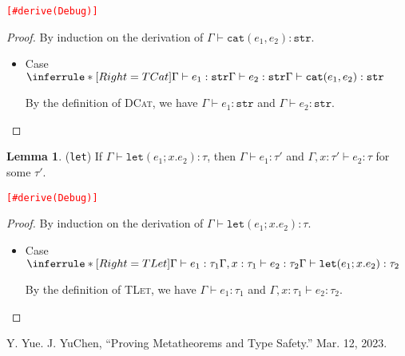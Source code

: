 \documentclass{article}
\theoremstyle{definition}
\newtheorem{lemma}{Lemma}[section]
\begin{document}
\noindent\textcolor{red}{\texttt{[\#derive(Debug)]}}
\color{red}
\begin{proof}
    By induction on the derivation of $\Gamma\vdash \mathtt{cat}(e_1,e_2):\mathtt{str}$.
    \begin{itemize}
        \item Case $\inferrule*[Right=TCat]{\Gamma \vdash e_1:\mathtt{str} \\ \Gamma \vdash e_2:\mathtt{str}}{\Gamma \vdash \mathtt{cat}(e_1,e_2) : \mathtt{str}}$

              By the definition of \textsc{DCat}, we have $\Gamma\vdash e_1:\mathtt{str}$ and $\Gamma\vdash e_2:\mathtt{str}$.
    \end{itemize}
\end{proof}
\color{black}

\begin{lemma}
    (\texttt{let}) If $\Gamma\vdash \mathtt{let}(e_1;x.e_2):\tau$, then $\Gamma\vdash e_1:\tau'$ and $\Gamma,x:\tau'\vdash e_2:\tau$ for some $\tau'$.
\end{lemma}

\noindent\textcolor{red}{\texttt{[\#derive(Debug)]}}
\color{red}
\begin{proof}
    By induction on the derivation of $\Gamma\vdash \mathtt{let}(e_1;x.e_2):\tau$.
    \begin{itemize}
        \item Case $\inferrule*[Right=TLet]{\Gamma \vdash e_1:\tau_1 \\ \Gamma,x:\tau_1 \vdash e_2:\tau_2}{\Gamma \vdash \mathtt{let}(e_1;x.e_2) : \tau_2}$

              By the definition of \textsc{TLet}, we have $\Gamma\vdash e_1:\tau_1$ and $\Gamma,x:\tau_1 \vdash e_2:\tau_2$.
    \end{itemize}
\end{proof}
\color{black}

\begin{thebibliography}{9}
     Y. Yue. J. YuChen, “Proving Metatheorems and Type Safety.” Mar. 12, 2023.
\end{thebibliography}
\end{document}
